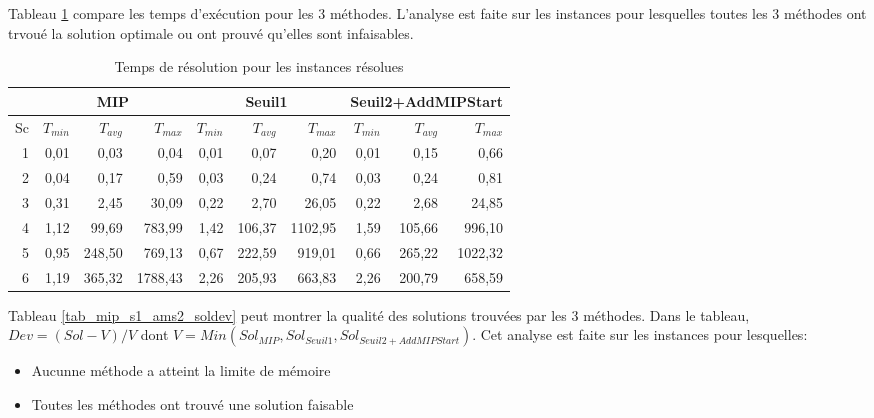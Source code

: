 Tableau \ref{tab_mip_s1_ams2_temps} compare les temps d'exécution pour les 3 méthodes. L'analyse est faite sur les instances pour lesquelles toutes les 3 méthodes ont trvoué la solution optimale ou ont prouvé qu'elles sont infaisables.
\begin{table}[h]
    \centering
    \begin{tabular}{|r|r|r|r|r|r|r|r|r|r|}
    	\hline
    &	\multicolumn{3}{c|}{MIP} &\multicolumn{3}{c|}{Seuil1} & \multicolumn{3}{c|}{Seuil2+AddMIPStart}	\\ \hline
Sc & $T_{min}$ & $T_{avg}$	& $T_{max}$ & $T_{min}$ & $T_{avg}$	& $T_{max}$ & $T_{min}$ & $T_{avg}$	& $T_{max}$  \\ \hline
1&	0,01	&0,03	&0,04	    &0,01	&0,07	&0,20	&0,01	&0,15	&0,66        \\ \hline
2&	0,04	&0,17	&0,59	    &0,03	&0,24	&0,74	&0,03	&0,24	&0,81        \\ \hline
3&	0,31	&2,45	&30,09	    &0,22	&2,70	&26,05	&0,22	&2,68	&24,85      	\\ \hline
4&	1,12	&99,69	&783,99	    &1,42	&106,37	&1102,95	&1,59	&105,66	&996,10      	\\ \hline
5&	0,95	&248,50	&769,13	    &0,67	&222,59	&919,01	&0,66	&265,22	&1022,32        \\ \hline
6&	1,19	&365,32	&1788,43	&2,26	&205,93	&663,83	&2,26	&200,79	&658,59      	\\ \hline
    \end{tabular}
    \caption{Temps de résolution pour les instances résolues}
    \label{tab_mip_s1_ams2_temps}
\end{table}
\bigskip

Tableau \ref{tab_mip_s1_ams2_soldev} peut montrer la qualité des solutions trouvées par les 3 méthodes. Dans le tableau, $Dev = (Sol-V)/V$ dont $V =Min(Sol_{MIP},Sol_{Seuil1},Sol_{Seuil2+AddMIPStart})$. Cet analyse est faite sur les instances pour lesquelles:
\begin{itemize}
 \item Aucunne méthode a atteint la limite de mémoire
 \item Toutes les méthodes ont trouvé une solution faisable
\end{itemize}

